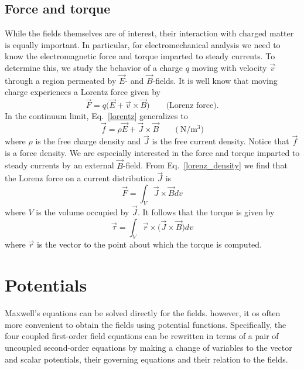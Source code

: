 \documentclass[11pt,a4paper,oneside]{book}
\numberwithin{equation}{section}
\theoremstyle{it}
\theoremstyle{definition}
\begin{document}
\subsection{Force and torque}
While the fields themselves are of interest, their interaction with charged matter is equally important. In particular, for electromechanical analysis we need to know the electromagnetic force and torque imparted to steady currents. To determine this, we study the behavior of a charge $q$ moving with velocity $\vec{v}$ through a region permeated by $\vec{E}$- and $\vec{B}$-fields. It is well know that moving charge experiences a Lorentz force given by 
\begin{equation}\label{lorenz}
	\vec{F} = q\big(\vec{E}+\vec{v}\times\vec{B}\big) \qquad\text{(Lorenz force).}
\end{equation}
In the continuum limit, Eq.~\eqref{lorentz} generalizes to 
\begin{equation}\label{lorenz_density}
	\vec{f} = \rho\vec{E}+\vec{J}\times\vec{B} \qquad\big(\SI{}{\newton\per\cubic\meter}\big)
\end{equation}
where $\rho$ is the free charge density and $\vec{J}$ is the free current density. Notice that $\vec{f}$ is a force density.
We are especially interested in the force and torque imparted to steady currents by an external $\vec{B}$-field. From Eq.~\eqref{lorenz_density} we find that the Lorenz force on a current distribution $\vec{J}$ is
\begin{equation}\label{lorenz_volume}
	\vec{F} = \int_{V}\vec{J}\times\vec{B}dv
\end{equation}
where $V$ is the volume occupied by $\vec{J}$. It follows that the torque is given by
\begin{equation}\label{torque_volume}
	\vec{\tau} = \int_{V}\vec{r}\times\big(\vec{J}\times\vec{B}\big)dv
\end{equation}
where $\vec{r}$ is the vector to the point about which the torque is computed.

\section{Potentials}
Maxwell's equations can be solved directly for the fields. however, it os often more convenient to obtain the fields using potential functions. Specifically, the four coupled first-order field equations can be rewritten in terms of a pair of uncoupled second-order equations by making a change of variables to the vector and scalar potentials, their governing equations and their relation to the fields.
\end{document}
